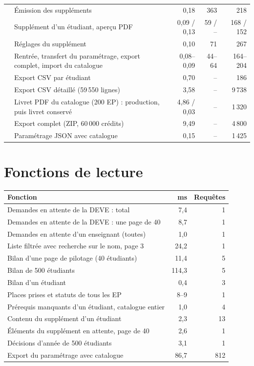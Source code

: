 \documentclass[11pt,a4paper]{article}
\begin{document}
\begin{longtable}{@{}p{1.9cm}p{7.6cm}RRR@{}}
 & Émission des suppléments & 0,18 & 363 & 218 \\
 & Supplément d'un étudiant, aperçu PDF & 0,09 / 0,13 & 59 / -- & 168 / 152 \\
 & Réglages du supplément & 0,10 & 71 & 267 \\
 & Rentrée, transfert du paramétrage, export complet, import du catalogue & 0,08--0,09 & 44--64 &
   164--204 \\
 & Export CSV par étudiant & 0,70 & -- & 186 \\
 & Export CSV détaillé (59\,550 lignes) & 3,58 & -- & 9\,738 \\
 & Livret PDF du catalogue (200 EP) : production, puis livret conservé & 4,86 / 0,03 & -- & 1\,320 \\
 & Export complet (ZIP, 60\,000 crédits) & 9,49 & -- & 4\,800 \\
 & Paramétrage JSON avec catalogue & 0,15 & -- & 1\,425 \\
\bottomrule
\end{longtable}

\section{Fonctions de lecture}

\begin{longtable}{@{}p{10cm} R R@{}}
\toprule
\textbf{Fonction} & \textbf{ms} & \textbf{Requêtes} \\
\midrule\endhead
Demandes en attente de la DEVE : total & 7,4 & 1 \\
Demandes en attente de la DEVE : une page de 40 & 8,7 & 1 \\
Demandes en attente d'un enseignant (toutes) & 1,0 & 1 \\
Liste filtrée avec recherche sur le nom, page 3 & 24,2 & 1 \\
Bilan d'une page de pilotage (40 étudiants) & 11,4 & 5 \\
Bilan de 500 étudiants & 114,3 & 5 \\
Bilan d'un étudiant & 0,4 & 3 \\
Places prises et statuts de tous les EP & 8--9 & 1 \\
Prérequis manquants d'un étudiant, catalogue entier & 1,0 & 4 \\
Contenu du supplément d'un étudiant & 2,3 & 13 \\
Éléments du supplément en attente, page de 40 & 2,6 & 1 \\
Décisions d'année de 500 étudiants & 3,1 & 1 \\
Export du paramétrage avec catalogue & 86,7 & 812 \\
\bottomrule
\end{longtable}
\end{document}
